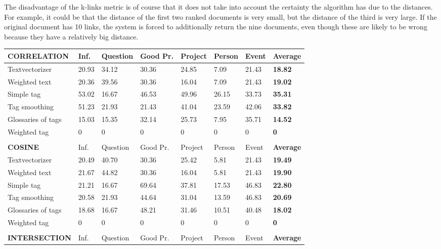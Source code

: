 The disadvantage of the k-links metric is of course that it does not take into account the certainty the algorithm has due to the distances. For example, it could be that the distance of the first two ranked documents is very small, but the distance of the third is very large. If the original document has 10 links, the system is forced to additionally return the nine documents, even though these are likely to be wrong because they have a relatively big distance. 

\begin{table}

\begin{tabular}{| l | l | l | l | l | l | l | l |}
\hline
{\bf CORRELATION} & Inf. &  Question &  Good Pr.& Project & Person &  Event & {\bf Average} \\
\hline
Textvectorizer & 20.93 & 34.12 & 30.36 & 24.85 & 7.09 & 21.43 & {\bf 18.82} \\ 
Weighted text & 20.36 & 39.56 & 30.36 & 16.04 & 7.09 & 21.43 & {\bf 19.02} \\ 
Simple tag & 53.02 & 16.67 & 46.53 & 49.96 & 26.15 & 33.73 & {\bf 35.31} \\ 
Tag smoothing & 51.23 & 21.93 & 21.43 & 41.04 & 23.59 & 42.06 & {\bf 33.82} \\ 
Glossaries of tags & 15.03 & 15.35 & 32.14 & 25.73 & 7.95 & 35.71 & {\bf 14.52} \\ 
Weighted tag & 0 & 0 & 0 & 0 & 0 & 0 & {\bf 0} \\ 
\hline
\\
\hline
{\bf COSINE} & Inf. &  Question &  Good Pr.& Project & Person &  Event & {\bf Average} \\
\hline
Textvectorizer & 20.49 & 40.70 & 30.36 & 25.42 & 5.81 & 21.43 & {\bf 19.49} \\ 
Weighted text & 21.67 & 44.82 & 30.36 & 16.04 & 5.81 & 21.43 & {\bf 19.90} \\ 
Simple tag & 21.21 & 16.67 & 69.64 & 37.81 & 17.53 & 46.83 & {\bf 22.80 } \\ 
Tag smoothing & 20.58 & 21.93 & 44.64 & 31.04 & 13.59 & 46.83 & {\bf 20.69} \\ 
Glossaries of tags & 18.68 & 16.67 & 48.21 & 31.46 & 10.51 & 40.48 & {\bf 18.02} \\ 
Weighted tag & 0 & 0 & 0 & 0 & 0 & 0 & {\bf 0} \\ 
\hline
\\
\hline
{\bf INTERSECTION} & Inf. &  Question &  Good Pr.& Project & Person &  Event & {\bf Average} \\

\end{tabular}
\end{table}
